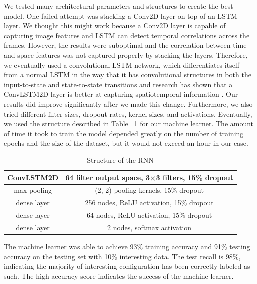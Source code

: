 \documentclass[12pt]{article}
\numberwithin{figure}{section} %
\begin{document}
We tested many architectural parameters and structures to create the best model. One failed attempt was stacking a Conv2D layer on top of an LSTM layer. We thought this might work because a Conv2D layer is capable of capturing image features and LSTM can detect temporal correlations across the frames. However, the results were suboptimal and the correlation between time and space features was not captured properly by stacking the layers. Therefore, we eventually used a convolutional LSTM network, which differentiates itself from a normal LSTM in the way that it has convolutional structures in both the input-to-state and state-to-state transitions and research has shown that a ConvLSTM2D layer is better at capturing spatiotemporal information \cite{ConvLSTM}. Our results did improve significantly after we made this change. Furthermore, we also tried different filter sizes, dropout rates, kernel sizes, and activations. Eventually, we used the structure described in Table ~\ref{table:RNN structure} for our machine learner. The amount of time it took to train the model depended greatly on the number of training epochs and the size of the dataset, but it would not exceed an hour in our case. 
\begin{table}[H]
\begin{center}
\begin{tabular}{ | c | c | } 
\hline
ConvLSTM2D & 64 filter output space, 3×3 filters, 15\% dropout \\ 
\hline
max pooling & (2, 2) pooling kernels, 15\% dropout  \\ 
\hline
dense layer & 256 nodes, ReLU activation, 15\% dropout  \\ 
\hline
dense layer & 64 nodes, ReLU activation, 15\% dropout  \\ 
\hline
dense layer & 2 nodes, softmax activation \\
\hline
\end{tabular}
\caption{Structure of the RNN}
\label{table:RNN structure}
\vspace{-2.5em}
\end{center}
\end{table}

The machine learner was able to achieve 93\% training accuracy and 91\% testing accuracy on the testing set with 10\% interesting data. The test recall is 98\%, indicating the majority of interesting configuration has been correctly labeled as such. The high accuracy score indicates the success of the machine learner. 
\end{document}
